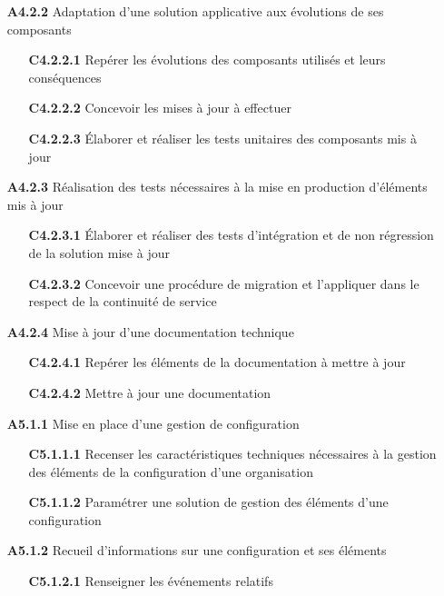 \documentclass[12pt,a4paper,oneside,titlepage,final]{article}
\begin{document}
\begin{enumerate}
\begin{itemize}
  \end{itemize}
  \item [\textbf{A4.2.2}] Adaptation d'une solution applicative aux
  évolutions de ses composants
  \begin{itemize}
    \item [\textbf{C4.2.2.1}] Repérer les évolutions des
    composants utilisés et leurs conséquences
    \item [\textbf{C4.2.2.2}] Concevoir les mises à jour à effectuer
    \item [\textbf{C4.2.2.3}] Élaborer et réaliser les tests unitaires
    des composants mis à jour
  \end{itemize}
  \item [\textbf{A4.2.3}] Réalisation des tests nécessaires à la mise
  en production d'éléments mis à jour
  \begin{itemize}
    \item [\textbf{C4.2.3.1}] Élaborer et réaliser des tests
    d'intégration et de non régression de la solution mise à jour
    \item [\textbf{C4.2.3.2}] Concevoir une procédure de migration et
    l'appliquer dans le respect de la continuité de service
  \end{itemize}
  \item [\textbf{A4.2.4}] Mise à jour d'une documentation technique
  \begin{itemize}
    \item [\textbf{C4.2.4.1}] Repérer les éléments de la
    documentation à mettre à jour
    \item [\textbf{C4.2.4.2}] Mettre à jour une documentation
  \end{itemize}
  \item [\textbf{A5.1.1}] Mise en place d'une gestion de configuration
  \begin{itemize}
    \item [\textbf{C5.1.1.1}] Recenser les caractéristiques
    techniques nécessaires à la gestion des éléments de la
    configuration d'une organisation
    \item [\textbf{C5.1.1.2}] Paramétrer une solution de gestion des
    éléments d'une configuration
  \end{itemize}
  \item [\textbf{A5.1.2}] Recueil d'informations sur une configuration
  et ses éléments
  \begin{itemize}
    \item [\textbf{C5.1.2.1}] Renseigner les événements relatifs

\end{itemize}
\end{enumerate}
\end{document}
